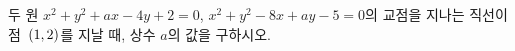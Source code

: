 두 원 $x^2+y^2+ax-4y+2=0$, $x^2+y^2-8x+ay-5=0$의 교점을 지나는 직선이 점~$(1{,}\mkern3mu\mathopen{}2)$를 지날 때, 상수 $a$의 값을 구하시오.
